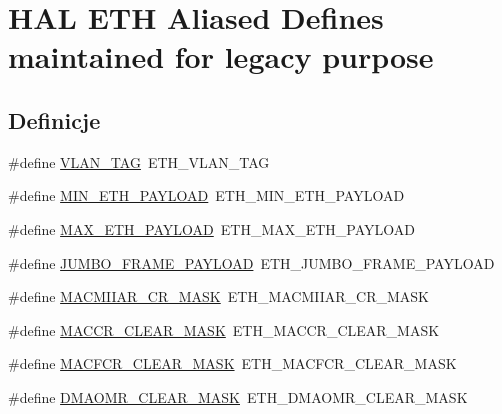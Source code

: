 \hypertarget{group___h_a_l___e_t_h___aliased___defines}{}\section{H\+AL E\+TH Aliased Defines maintained for legacy purpose}
\label{group___h_a_l___e_t_h___aliased___defines}
\subsection*{Definicje}
\begin{DoxyCompactItemize}
\item 
\#define \hyperlink{group___h_a_l___e_t_h___aliased___defines_ga04830f6ce829978038a6219a05883df2}{V\+L\+A\+N\+\_\+\+T\+AG}~E\+T\+H\+\_\+\+V\+L\+A\+N\+\_\+\+T\+AG
\item 
\#define \hyperlink{group___h_a_l___e_t_h___aliased___defines_gad2bb317493313e77ae02b99419a41e28}{M\+I\+N\+\_\+\+E\+T\+H\+\_\+\+P\+A\+Y\+L\+O\+AD}~E\+T\+H\+\_\+\+M\+I\+N\+\_\+\+E\+T\+H\+\_\+\+P\+A\+Y\+L\+O\+AD
\item 
\#define \hyperlink{group___h_a_l___e_t_h___aliased___defines_ga4041187e6b5a98c2d367ed1efc7b91ae}{M\+A\+X\+\_\+\+E\+T\+H\+\_\+\+P\+A\+Y\+L\+O\+AD}~E\+T\+H\+\_\+\+M\+A\+X\+\_\+\+E\+T\+H\+\_\+\+P\+A\+Y\+L\+O\+AD
\item 
\#define \hyperlink{group___h_a_l___e_t_h___aliased___defines_ga09553e569664fd298646602806b777f5}{J\+U\+M\+B\+O\+\_\+\+F\+R\+A\+M\+E\+\_\+\+P\+A\+Y\+L\+O\+AD}~E\+T\+H\+\_\+\+J\+U\+M\+B\+O\+\_\+\+F\+R\+A\+M\+E\+\_\+\+P\+A\+Y\+L\+O\+AD
\item 
\#define \hyperlink{group___h_a_l___e_t_h___aliased___defines_ga0d72ec6a764572a2fa52f6c2d0648b5b}{M\+A\+C\+M\+I\+I\+A\+R\+\_\+\+C\+R\+\_\+\+M\+A\+SK}~E\+T\+H\+\_\+\+M\+A\+C\+M\+I\+I\+A\+R\+\_\+\+C\+R\+\_\+\+M\+A\+SK
\item 
\#define \hyperlink{group___h_a_l___e_t_h___aliased___defines_ga6415e52119d875b78a80ee4186233643}{M\+A\+C\+C\+R\+\_\+\+C\+L\+E\+A\+R\+\_\+\+M\+A\+SK}~E\+T\+H\+\_\+\+M\+A\+C\+C\+R\+\_\+\+C\+L\+E\+A\+R\+\_\+\+M\+A\+SK
\item 
\#define \hyperlink{group___h_a_l___e_t_h___aliased___defines_ga0fc15b5e25134974f3a371c17882e36d}{M\+A\+C\+F\+C\+R\+\_\+\+C\+L\+E\+A\+R\+\_\+\+M\+A\+SK}~E\+T\+H\+\_\+\+M\+A\+C\+F\+C\+R\+\_\+\+C\+L\+E\+A\+R\+\_\+\+M\+A\+SK
\item 
\#define \hyperlink{group___h_a_l___e_t_h___aliased___defines_gad1b188dfe2cdaea68fb36806a0b94b95}{D\+M\+A\+O\+M\+R\+\_\+\+C\+L\+E\+A\+R\+\_\+\+M\+A\+SK}~E\+T\+H\+\_\+\+D\+M\+A\+O\+M\+R\+\_\+\+C\+L\+E\+A\+R\+\_\+\+M\+A\+SK

\end{DoxyCompactItemize}
